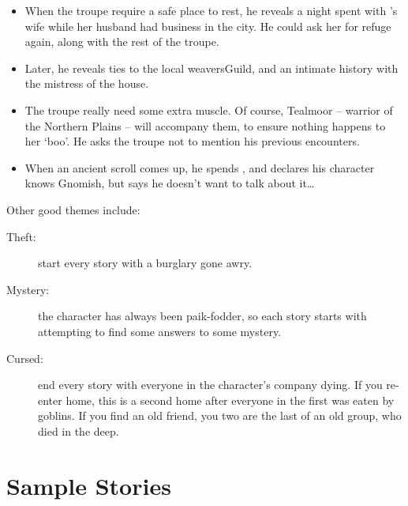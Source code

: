 \begin{multicols}{2}
\begin{itemize}
  \item
  When the troupe require a safe place to rest, he reveals a night spent with 's wife while her husband had business in the city.
  He could ask her for refuge again, along with the rest of the troupe.
  \item
  Later, he reveals ties to the local \gls{weaversGuild}, and an intimate history with the mistress of the house.
  \item
  The troupe really need some extra muscle.
  Of course, Tealmoor -- warrior of the Northern Plains -- will accompany them, to ensure nothing happens to her `boo'.
  He asks the troupe not to mention his previous encounters.
  \item
  When an ancient scroll comes up, he spends , and declares his character knows Gnomish, but says he doesn't want to talk about it\ldots
\end{itemize}

Other good themes include:

\begin{description}
  \item[Theft:]
  start every story with a burglary gone awry.
  \item[Mystery:]
  the character has always been \gls{paik}-fodder, so each story starts with attempting to find some answers to some mystery.
  \item[Cursed:]
  end every story with everyone in the character's company dying.
  If you re-enter home, this is a second home after everyone in the first was eaten by goblins.
  If you find an old friend, you two are the last of an old group, who died in the \gls{deep}.
\end{description}

\end{multicols}

\section{Sample Stories}


